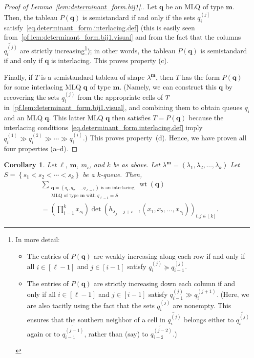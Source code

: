 \documentclass[reqno]{amsart}
\newcommand{\0}{\phantom{c}}
\DeclareMathOperator{\wt}{wt} %
\newcommand{\mm}{\mathbf{m}}
\newcommand{\qq}{\mathbf{q}}
\let\sumnonlimits\sum
\let\prodnonlimits\prod
\renewcommand{\sum}{\sumnonlimits\limits}
\renewcommand{\prod}{\prodnonlimits\limits}
\newcommand{\set}[1]{\left\{ #1 \right\}}
\newcommand{\tup}[1]{\left( #1 \right)}
\newcommand{\ive}[1]{\left[ #1 \right]}
\theoremstyle{plain}
\newtheorem{cor}[thm]{Corollary}
\theoremstyle{definition}
\numberwithin{equation}{section}
\begin{document}
\begin{proof}[Proof of Lemma~\ref{lem:determinant_form.bij1}.]
Let $\qq$ be an MLQ of type $\mm$.
Then, the tableau $P(\qq)$ is semistandard if and only if the sets $q_i^{(j)}$ satisfy~\eqref{eq.determinant_form.interlacing.def} (this is easily seen from~\eqref{pf.lem:determinant_form.bij1.visual} and from the fact that the columns $\widetilde{q_i^{(j)}}$ are strictly increasing\footnote{In more detail:
\begin{itemize}
\item The entries of $P(\qq)$ are weakly increasing along each row
if and only if all $i \in \ive{\ell-1}$ and $j \in \ive{i-1}$ satisfy
$q_i^{\left(j\right)} \succeq q_{i-1}^{\left(j\right)}$.
\item The entries of $P(\qq)$ are strictly increasing down each
column if and only if all $i \in \ive{\ell-1}$ and $j \in \ive{i-1}$ satisfy
$q_{i-1}^{\left(j\right)} \gg q_i^{\left(j+1\right)}$.
(Here, we are also tacitly using the fact that the sets
$q_i^{\left(  j\right)  }$ are nonempty. This ensures that the southern
neighbor of a cell in $\widetilde{q_i^{\left(  j\right)  }}$ belongs either
to $\widetilde{q_i^{\left(  j\right)  }}$ again or to
$\widetilde{q_{i-1}^{\left(  j-1\right)  }}$, rather than (say) to
$\widetilde{q_{i-2}^{\left(  j-2\right)  }}$.)
\end{itemize}
});
in other words, the tableau $P(\qq)$ is semistandard if and only if $\qq$ is interlacing.
This proves property (c).

Finally, if $T$ is a semistandard tableau of shape $\lambda^{\mm}$, then $T$ has the form $P(\qq)$ for some interlacing MLQ $\qq$ of type $\mm$.
(Namely, we can construct this $\qq$ by recovering the sets $q_i^{(j)}$ from the appropriate cells of $T$ in~\eqref{pf.lem:determinant_form.bij1.visual}, and combining them to obtain queues $q_i$ and an MLQ $\qq$.
This latter MLQ $\qq$ then satisfies $T = P(\qq)$ because the interlacing conditions~\eqref{eq.determinant_form.interlacing.def} imply $q_i^{(1)} \gg q_i^{(2)} \gg \cdots \gg q_i^{(i)}$.)
This proves property~(d).
Hence, we have proven all four properties (a--d).
\end{proof}

\begin{cor}
\label{cor:determinant_form.bij1c}
Let $\ell$, $\mm$, $m_i$, and $k$ be as above.
Let $\lambda^{\mm} = \tup{\lambda_1, \lambda_2, \dotsc, \lambda_k}$
Let $S = \set{s_1 < s_2 < \cdots < s_k}$ be a $k$-queue.
Then,
\begin{align*}
&  \sum_{\substack{\qq=\tup{q_1,q_2,\ldots,q_{\ell-1}} \text{ is an interlacing}\\\text{MLQ of type $\mm$ with } q_{\ell-1}=S}} \wt(\qq) \\
&  = \left(  \prod_{i=1}^{k}x_{s_i}\right)
    \det\left(h_{\lambda_j-j+i-1}(x_1, x_2, \dotsc, x_{s_j}) \right)_{i, j \in \ive{k}} .
\end{align*}
\end{cor}
\end{document}
